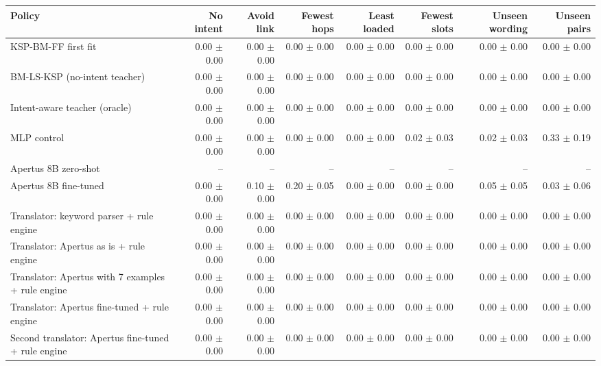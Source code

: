 \begin{tabular}{lrrrrrrr}
\toprule
Policy & No intent & Avoid link & Fewest hops & Least loaded & Fewest slots & Unseen wording & Unseen pairs \\
\midrule
KSP-BM-FF first fit & 0.00 $\pm$ 0.00 & 0.00 $\pm$ 0.00 & 0.00 $\pm$ 0.00 & 0.00 $\pm$ 0.00 & 0.00 $\pm$ 0.00 & 0.00 $\pm$ 0.00 & 0.00 $\pm$ 0.00 \\
BM-LS-KSP (no-intent teacher) & 0.00 $\pm$ 0.00 & 0.00 $\pm$ 0.00 & 0.00 $\pm$ 0.00 & 0.00 $\pm$ 0.00 & 0.00 $\pm$ 0.00 & 0.00 $\pm$ 0.00 & 0.00 $\pm$ 0.00 \\
Intent-aware teacher (oracle) & 0.00 $\pm$ 0.00 & 0.00 $\pm$ 0.00 & 0.00 $\pm$ 0.00 & 0.00 $\pm$ 0.00 & 0.00 $\pm$ 0.00 & 0.00 $\pm$ 0.00 & 0.00 $\pm$ 0.00 \\
MLP control & 0.00 $\pm$ 0.00 & 0.00 $\pm$ 0.00 & 0.00 $\pm$ 0.00 & 0.00 $\pm$ 0.00 & 0.02 $\pm$ 0.03 & 0.02 $\pm$ 0.03 & 0.33 $\pm$ 0.19 \\
Apertus 8B zero-shot & -- & -- & -- & -- & -- & -- & -- \\
Apertus 8B fine-tuned & 0.00 $\pm$ 0.00 & 0.10 $\pm$ 0.00 & 0.20 $\pm$ 0.05 & 0.00 $\pm$ 0.00 & 0.00 $\pm$ 0.00 & 0.05 $\pm$ 0.05 & 0.03 $\pm$ 0.06 \\
Translator: keyword parser + rule engine & 0.00 $\pm$ 0.00 & 0.00 $\pm$ 0.00 & 0.00 $\pm$ 0.00 & 0.00 $\pm$ 0.00 & 0.00 $\pm$ 0.00 & 0.00 $\pm$ 0.00 & 0.00 $\pm$ 0.00 \\
Translator: Apertus as is + rule engine & 0.00 $\pm$ 0.00 & 0.00 $\pm$ 0.00 & 0.00 $\pm$ 0.00 & 0.00 $\pm$ 0.00 & 0.00 $\pm$ 0.00 & 0.00 $\pm$ 0.00 & 0.00 $\pm$ 0.00 \\
Translator: Apertus with 7 examples + rule engine & 0.00 $\pm$ 0.00 & 0.00 $\pm$ 0.00 & 0.00 $\pm$ 0.00 & 0.00 $\pm$ 0.00 & 0.00 $\pm$ 0.00 & 0.00 $\pm$ 0.00 & 0.00 $\pm$ 0.00 \\
Translator: Apertus fine-tuned + rule engine & 0.00 $\pm$ 0.00 & 0.00 $\pm$ 0.00 & 0.00 $\pm$ 0.00 & 0.00 $\pm$ 0.00 & 0.00 $\pm$ 0.00 & 0.00 $\pm$ 0.00 & 0.00 $\pm$ 0.00 \\
Second translator: Apertus fine-tuned + rule engine & 0.00 $\pm$ 0.00 & 0.00 $\pm$ 0.00 & 0.00 $\pm$ 0.00 & 0.00 $\pm$ 0.00 & 0.00 $\pm$ 0.00 & 0.00 $\pm$ 0.00 & 0.00 $\pm$ 0.00 \\
\bottomrule
\end{tabular}

